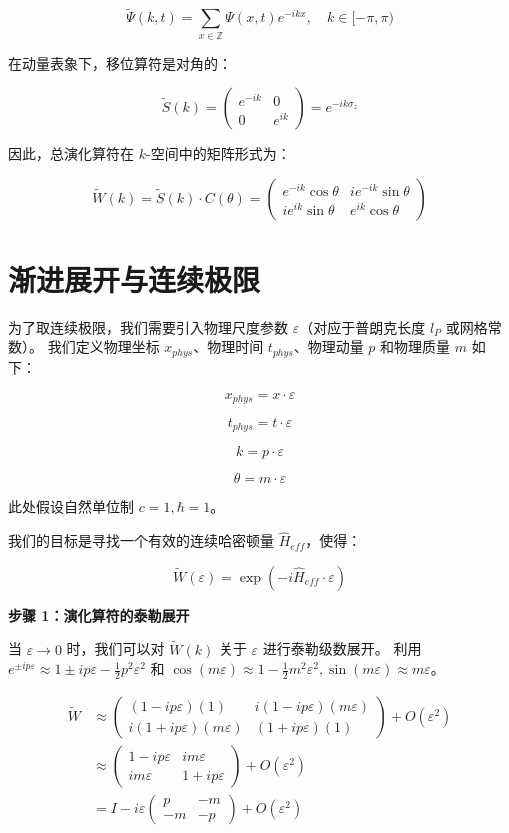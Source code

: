 \[\tilde{\Psi}(k, t) = \sum_{x \in \mathbb{Z}} \Psi(x, t) e^{-ikx}, \quad k \in [-\pi, \pi)\]

在动量表象下，移位算符是对角的：

\[\tilde{S}(k) = \begin{pmatrix} e^{-ik} & 0 \\ 0 & e^{ik} \end{pmatrix} = e^{-ik \sigma_z}\]

因此，总演化算符在 $k$-空间中的矩阵形式为：

\[\tilde{W}(k) = \tilde{S}(k) \cdot C(\theta) = \begin{pmatrix} e^{-ik} \cos \theta & i e^{-ik} \sin \theta \\ i e^{ik} \sin \theta & e^{ik} \cos \theta \end{pmatrix}\]

\section{渐进展开与连续极限}

为了取连续极限，我们需要引入物理尺度参数 $\varepsilon$（对应于普朗克长度 $l_P$ 或网格常数）。
我们定义物理坐标 $x_{phys}$、物理时间 $t_{phys}$、物理动量 $p$ 和物理质量 $m$ 如下：

\[x_{phys} = x \cdot \varepsilon\]

\[t_{phys} = t \cdot \varepsilon\]

\[k = p \cdot \varepsilon\]

\[\theta = m \cdot \varepsilon\]

此处假设自然单位制 $c=1, \hbar=1$。

我们的目标是寻找一个有效的连续哈密顿量 $\hat{H}_{eff}$，使得：

\[\tilde{W}(\varepsilon) = \exp(-i \hat{H}_{eff} \cdot \varepsilon)\]

\textbf{步骤 1：演化算符的泰勒展开}

当 $\varepsilon \to 0$ 时，我们可以对 $\tilde{W}(k)$ 关于 $\varepsilon$ 进行泰勒级数展开。
利用 $e^{\pm i p \varepsilon} \approx 1 \pm i p \varepsilon - \frac{1}{2} p^2 \varepsilon^2$ 和 $\cos(m\varepsilon) \approx 1 - \frac{1}{2}m^2\varepsilon^2, \sin(m\varepsilon) \approx m\varepsilon$。

\[\begin{aligned}
\tilde{W} &\approx \begin{pmatrix} (1 - ip\varepsilon)(1) & i(1 - ip\varepsilon)(m\varepsilon) \\ i(1 + ip\varepsilon)(m\varepsilon) & (1 + ip\varepsilon)(1) \end{pmatrix} + O(\varepsilon^2) \\
&\approx \begin{pmatrix} 1 - ip\varepsilon & im\varepsilon \\ im\varepsilon & 1 + ip\varepsilon \end{pmatrix} + O(\varepsilon^2) \\
&= I - i\varepsilon \begin{pmatrix} p & -m \\ -m & -p \end{pmatrix} + O(\varepsilon^2)
\end{aligned}\]

